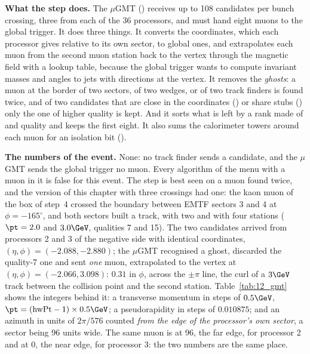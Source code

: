 \textbf{What the step does.} The $\mu$GMT () receives up to 108 candidates per bunch
crossing, three from each of the 36 processors, and must hand eight muons to the global trigger. It does three
things. It converts the coordinates, which each processor gives relative to its own sector, to global ones, and
extrapolates each muon from the second muon station back to the vertex through the magnetic field with a lookup
table, because the global trigger wants to compute invariant masses and angles to jets with directions at the
vertex. It removes the \emph{ghosts}: a muon at the border of two sectors, of two wedges, or of two track finders
is found twice, and of two candidates that are close in the coordinates () or
share stubs () only the one of higher quality is kept. And it sorts what is left
by a rank made of \pt{} and quality and keeps the first eight. It also sums the calorimeter towers around each
muon for an isolation bit ().

\textbf{The numbers of the event.} None: no track finder sends a candidate, and the $\mu$GMT sends the global
trigger no muon. Every algorithm of the menu with a muon in it is false for this event. The step is best seen on a
muon found twice, and the version of this chapter with three crossings had one: the kaon muon of the box of step~4
crossed the boundary between EMTF sectors 3 and 4 at $\phi=-165^\circ$, and both sectors built a track, with two and
with four stations ($\pt=2.0$ and $3.0\GeV$, qualities 7 and 15). The two candidates arrived from processors 2 and 3
of the negative side with identical coordinates, $(\eta,\phi)=(-2.088,-2.880)$; the $\mu$GMT recognised a ghost,
discarded the quality-7 one and sent \emph{one} muon, extrapolated to the vertex at $(\eta,\phi)=(-2.066,3.098)$: $0.31$
in $\phi$, across the $\pm\pi$ line, the curl of a $3\GeV$ track between the collision point and the second station.
Table~\ref{tab:12_gmt} shows the integers behind it: a transverse momentum in steps of $0.5\GeV$,
$\pt=(\mathrm{hwPt}-1)\times0.5\GeV$; a pseudorapidity in steps of $0.010875$; and an azimuth in units of $2\pi/576$
counted \emph{from the edge of the processor's own sector}, a sector being 96 units wide. The same muon is at 96, the
far edge, for processor 2 and at 0, the near edge, for processor 3: the two numbers are the same place.

